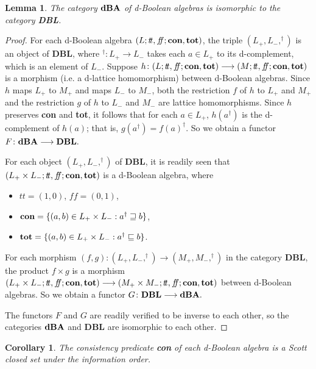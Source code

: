 \documentclass[11pt]{article}
\theoremstyle{plain}
\newtheorem{lem}[thm]{Lemma}
\newtheorem{cor}[thm]{Corollary}
\theoremstyle{definition}
\newcommand{\dbt}{{t\!t}}
\newcommand{\dbf}{{f\!\!f}}
\newcommand{\dBoo}{\bf dBA}
\newcommand{\lra}{\longrightarrow}
\begin{document}
\begin{lem}\label{d-Bool as DBL} The category $\dBoo$ of d-Boolean algebras is isomorphic to the category {\bf DBL}. \end{lem}

\begin{proof} For each d-Boolean algebra $(L;\dbt,\dbf;{\bf con},{\bf tot})$, the triple $(L_+,L_-, ^\dag)$ is an object of {\bf DBL}, where $ ^\dag\colon L_+\lra L_-$ takes each $a\in L_+$ to its d-complement, which is an element of $L_-$. Suppose $h\colon (L;\dbt,\dbf;{\bf con},{\bf tot})\lra (M;\dbt,\dbf;{\bf con},{\bf tot})$ is a morphism (i.e. a d-lattice homomorphism) between d-Boolean algebras. Since $h$ maps $L_+$ to $M_+$ and maps $L_-$ to $M_-$, both the restriction $f$ of $h$ to $L_+$ and $M_+$ and the restriction $g$ of $h$ to $L_-$ and $M_-$  are lattice homomorphisms. Since $h$ preserves {\bf con} and {\bf tot}, it follows that for each $a\in L_+$, $h(a^\dag)$ is the d-complement of $h(a)$; that is, $g(a^\dag)=f(a)^\dag$. So we obtain a functor  $F\colon\dBoo\lra {\bf DBL}.$  

For each object $(L_+,L_-, ^\dag)$ of {\bf DBL}, it is readily seen that $(L_+\times L_-;\dbt,\dbf;{\bf con},{\bf tot})$ is a d-Boolean algebra, where \begin{itemize}\setlength{\itemsep}{0pt}
\item   $\dbt=(1,0)$, $\dbf=(0,1)$, \item ${\bf con}=\{(a,b)\in L_+\times L_-: a^\dag\sqsupseteq b\}$, \item ${\bf tot}=\{(a,b)\in L_+\times L_-: a^\dag\sqsubseteq b\}$.\end{itemize} For each morphism $(f,g)\colon (L_+,L_-, ^\dag)\lra (M_+,M_-, ^\dag)$ in the category {\bf DBL},  the product $f\times g$  is a morphism $(L_+\times L_-;\dbt,\dbf;{\bf con},{\bf tot})\lra (M_+\times M_-;\dbt,\dbf;{\bf con},{\bf tot})$ between  d-Boolean algebras. So we obtain a functor  $G\colon {\bf DBL}\lra\dBoo.$   

The functors $F$ and $G$ are readily verified to be inverse to each other, so the categories $\dBoo$ and {\bf DBL} are isomorphic to each other. \end{proof}

\begin{cor}\label{dBA via order reversing} The consistency predicate {\bf con} of each d-Boolean algebra is a Scott closed set under the information order. \end{cor} 
\end{document}
